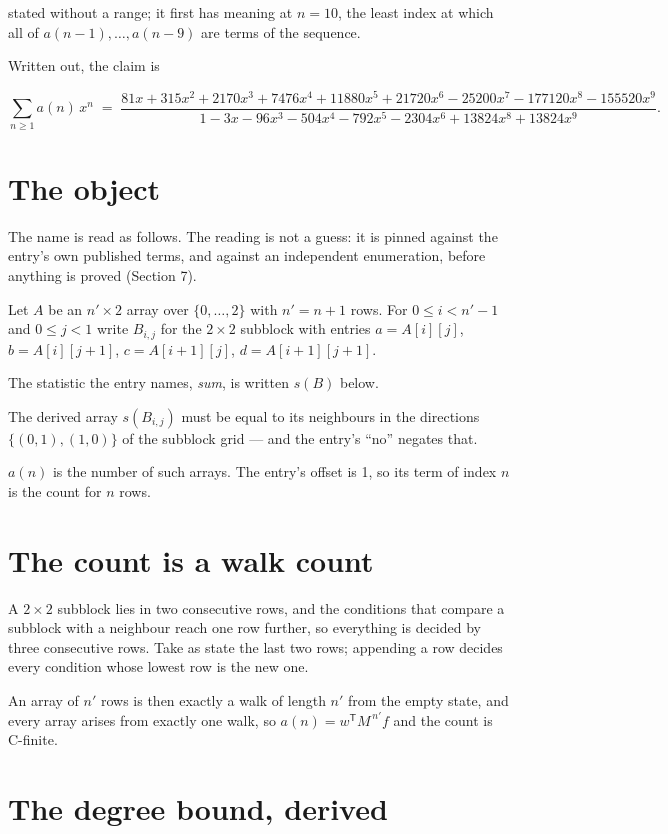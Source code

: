 \documentclass[11pt]{article}
\theoremstyle{definition}
\begin{document}
stated without a range; it first has meaning at $n = 10$, the least index at which all of $a(n-1),\dots,a(n-9)$ are terms of the sequence.

Written out, the claim is

\[\sum_{n \ge 1} a(n)\,x^n \;=\; \frac{81x + 315x^{2} + 2170x^{3} + 7476x^{4} + 11880x^{5} + 21720x^{6} - 25200x^{7} - 177120x^{8} - 155520x^{9}}{1 - 3x - 96x^{3} - 504x^{4} - 792x^{5} - 2304x^{6} + 13824x^{8} + 13824x^{9}}.\]

\section{The object}

The name is read as follows. The reading is not a guess: it is pinned against the entry's own published terms, and against an independent enumeration, before anything is proved (Section 7).

Let $A$ be an $n' \times 2$ array over $\{0,\dots,2\}$ with $n' = n + 1$ rows. For $0 \le i < n'-1$ and $0 \le j < 1$ write $B_{i,j}$ for the $2\times2$ subblock with entries $a = A[i][j]$, $b = A[i][j{+}1]$, $c = A[i{+}1][j]$, $d = A[i{+}1][j{+}1]$.

The statistic the entry names, {\itshape sum}, is written $s(B)$ below.

The derived array $s(B_{i,j})$ must be equal to its neighbours in the directions $\{(0,1), (1,0)\}$ of the subblock grid --- and the entry's ``no'' negates that.

$a(n)$ is the number of such arrays. The entry's offset is 1, so its term of index $n$ is the count for $n$ rows.

\section{The count is a walk count}

A $2\times2$ subblock lies in two consecutive rows, and the conditions that compare a subblock with a neighbour reach one row further, so everything is decided by three consecutive rows. Take as state the last two rows; appending a row decides every condition whose lowest row is the new one.

An array of $n'$ rows is then exactly a walk of length $n'$ from the empty state, and every array arises from exactly one walk, so $a(n) = w^{\mathsf T}M^{\,n'}f$ and the count is C-finite.

\section{The degree bound, derived}
\end{document}
